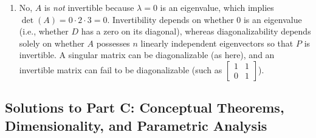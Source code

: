 \documentclass[11pt, letterpaper]{article}
\theoremstyle{definition}
\theoremstyle{remark}
\begin{document}
\begin{enumerate}[label=(\alph*)]
\begin{itemize}
\[        \]
        \item For $\lambda_{3} = 3$:
        \[
        A - 3I = \begin{bmatrix} -1 & 0 & 1 \\ 0 & -1 & 1 \\ 1 & 1 & -2 \end{bmatrix} \sim \begin{bmatrix} 1 & 0 & -1 \\ 0 & 1 & -1 \\ 0 & 0 & 0 \end{bmatrix} \implies \mathbf{v}_{3} = \begin{bmatrix} 1 \\ 1 \\ 1 \end{bmatrix}.
        \]
    \end{itemize}
    Hence $P = \begin{bmatrix} 1 & 1 & 1 \\ 1 & -1 & 1 \\ -2 & 0 & 1 \end{bmatrix}$ and $D = \begin{bmatrix} 0 & 0 & 0 \\ 0 & 2 & 0 \\ 0 & 0 & 3 \end{bmatrix}$.

    \item No, $A$ is \emph{not} invertible because $\lambda = 0$ is an eigenvalue, which implies $\det(A) = 0 \cdot 2 \cdot 3 = 0$. Invertibility depends on whether $0$ is an eigenvalue (i.e., whether $D$ has a zero on its diagonal), whereas diagonalizability depends solely on whether $A$ possesses $n$ linearly independent eigenvectors so that $P$ is invertible. A singular matrix can be diagonalizable (as here), and an invertible matrix can fail to be diagonalizable (such as $\begin{bmatrix} 1 & 1 \\ 0 & 1 \end{bmatrix}$).
\end{enumerate}

\subsection{Solutions to Part C: Conceptual Theorems, Dimensionality, and Parametric Analysis}
\end{document}
